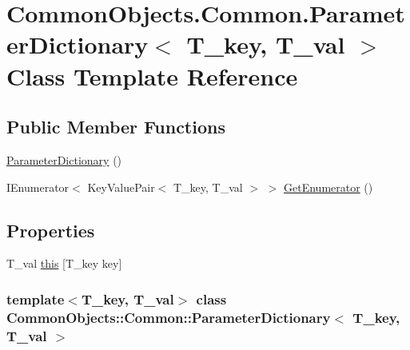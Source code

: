 \hypertarget{class_common_objects_1_1_common_1_1_parameter_dictionary-g}{
\section{CommonObjects.Common.ParameterDictionary$<$ T\_\-key, T\_\-val $>$ Class Template Reference}
\label{class_common_objects_1_1_common_1_1_parameter_dictionary-g}
}
\subsection*{Public Member Functions}
\begin{DoxyCompactItemize}
\item 
\hyperlink{class_common_objects_1_1_common_1_1_parameter_dictionary-g_aeb4134d19738cbc96ecdb73231293f05}{ParameterDictionary} ()
\item 
IEnumerator$<$ KeyValuePair$<$ T\_\-key, T\_\-val $>$ $>$ \hyperlink{class_common_objects_1_1_common_1_1_parameter_dictionary-g_a588e67246e6e50418a5d4c445f7a3eb1}{GetEnumerator} ()
\end{DoxyCompactItemize}
\subsection*{Properties}
\begin{DoxyCompactItemize}
\item 
T\_\-val \hyperlink{class_common_objects_1_1_common_1_1_parameter_dictionary-g_adf91a4cef5d0e9c5657e1d3f62c5e5f0}{this} \mbox{[}T\_\-key key\mbox{]}
\end{DoxyCompactItemize}
\subsubsection*{template$<$T\_\-key, T\_\-val$>$ class CommonObjects::Common::ParameterDictionary$<$ T\_\-key, T\_\-val $>$}



